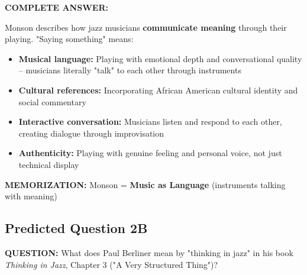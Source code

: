 \documentclass[11pt]{article}
\begin{document}
\begin{mdframed}[backgroundcolor=answercolor!10, linewidth=2pt]
\textbf{\textcolor{answercolor}{COMPLETE ANSWER:}}

Monson describes how jazz musicians \textbf{communicate meaning} through their playing. "Saying something" means:

\begin{itemize}[leftmargin=*, nosep]
    \item \textbf{Musical language:} Playing with emotional depth and conversational quality – musicians literally "talk" to each other through instruments
    \item \textbf{Cultural references:} Incorporating African American cultural identity and social commentary
    \item \textbf{Interactive conversation:} Musicians listen and respond to each other, creating dialogue through improvisation
    \item \textbf{Authenticity:} Playing with genuine feeling and personal voice, not just technical display
\end{itemize}

\vspace{5pt}
\end{mdframed}

\textbf{MEMORIZATION:} Monson = \textbf{Music as Language} (instruments talking with meaning)

\subsection*{Predicted Question 2B}

\begin{mdframed}[backgroundcolor=questioncolor!10, linewidth=2pt]
\textbf{\textcolor{questioncolor}{QUESTION:}} What does Paul Berliner mean by "thinking in jazz" in his book \textit{Thinking in Jazz}, Chapter 3 ("A Very Structured Thing")?
\end{mdframed}
\end{document}
